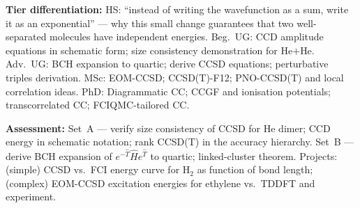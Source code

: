 \documentclass[11pt,a4paper]{article}
\begin{document}
\begin{tcolorbox}[modulebox, title={Module~II.1 --- Lecture L04: Coupled-Cluster Methods}]
\medskip\textbf{Tier differentiation:}
HS: ``instead of writing the wavefunction as a sum, write it as an exponential'' ---
why this small change guarantees that two well-separated molecules have independent energies.
Beg.\ UG: CCD amplitude equations in schematic form; size consistency demonstration for He$+$He.
Adv.\ UG: BCH expansion to quartic; derive CCSD equations; perturbative triples derivation.
MSc: EOM-CCSD; CCSD(T)-F12; PNO-CCSD(T) and local correlation ideas.
PhD: Diagrammatic CC; CCGF and ionisation potentials; transcorrelated CC; FCIQMC-tailored CC.

\medskip\textbf{Assessment:}
Set~A --- verify size consistency of CCSD for He dimer; CCD energy in schematic notation;
rank CCSD(T) in the accuracy hierarchy.
Set~B --- derive BCH expansion of $e^{-\hat{T}}\hat{H}e^{\hat{T}}$ to quartic; linked-cluster theorem.
Projects: (simple) CCSD vs.\ FCI energy curve for H$_2$ as function of bond length;
(complex) EOM-CCSD excitation energies for ethylene vs.\ TDDFT and experiment.
\end{tcolorbox}

\medskip
\end{document}
